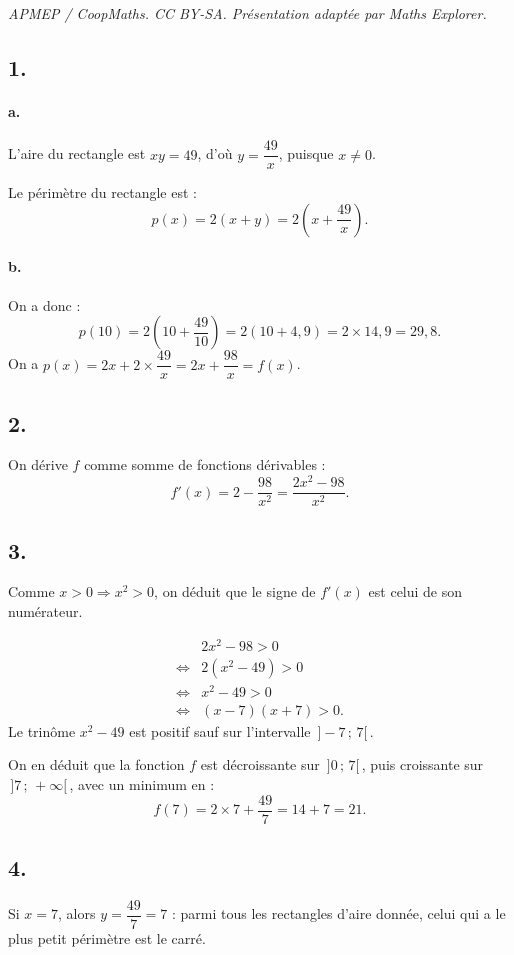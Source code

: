 \documentclass[10pt]{article}
\begin{document}
\noindent\textit{APMEP / CoopMaths. CC BY-SA. Présentation adaptée par Maths Explorer.}\par\medskip
\subsection*{1.}

\paragraph{a.} L'aire du rectangle est \( x y = 49 \), d'où \( y = \dfrac{49}{x} \), puisque \( x \neq 0 \).

Le périmètre du rectangle est :
\[
p(x) = 2(x + y) = 2\left(x + \dfrac{49}{x}\right).
\]

\paragraph{b.} On a donc :
\[
p(10) = 2\left(10 + \dfrac{49}{10}\right) = 2(10 + 4{,}9) = 2 \times 14{,}9 = 29{,}8.
\]
On a \(p(x) = 2x + 2 \times \dfrac{49}{x} = 2x + \dfrac{98}{x} = f(x)\).

\subsection*{2.}

On dérive \(f\) comme somme de fonctions dérivables :
\[
f'(x) = 2 - \dfrac{98}{x^2} = \dfrac{2x^2 - 98}{x^2}.
\]

\subsection*{3.}

Comme \(x > 0 \Rightarrow x^2 > 0\), on déduit que le signe de \(f'(x)\) est celui de son numérateur.

\begin{align*}
&2x^2 - 98 > 0 \\
\iff &2(x^2 - 49) > 0 \\
\iff &x^2 - 49 > 0 \\
\iff &(x - 7)(x + 7) > 0.
\end{align*}
Le trinôme \(x^2 - 49\) est positif sauf sur l'intervalle \(\,] - 7 \,;\, 7 [\,\).

On en déduit que la fonction \(f\) est décroissante sur \(\,] 0 \,;\, 7 [\,\), puis croissante sur \(\,] 7 \,;\, +\infty [\,\), avec un minimum en :
\[
f(7) = 2 \times 7 + \dfrac{49}{7} = 14 + 7 = 21.
\]

\begin{center}
\end{center}

\subsection*{4.}

Si \(x = 7\), alors \(y = \dfrac{49}{7} = 7\) : parmi tous les rectangles d'aire donnée, celui qui a le plus petit périmètre est le carré.
\end{document}
